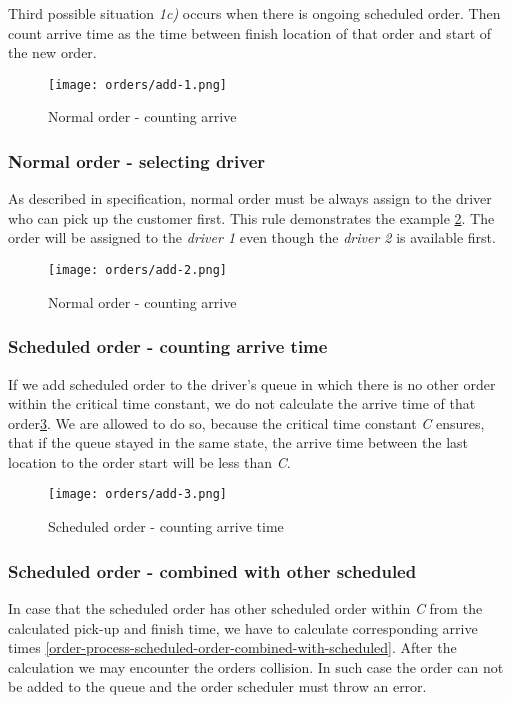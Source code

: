 	Third possible situation \textit{1c)} occurs when there is ongoing scheduled order. Then count arrive time as the time between finish location of that order and start of the new order.
	
	
		\begin{figure}[h]\centering
			\texttt{[image: orders/add-1.png]}
			\caption{Normal order - counting arrive} 
			\label{order-process-normal-order-counting-arrive}
		\end{figure} 
	
	\subsubsection{Normal order - selecting driver}
	
		As described in specification, normal order must be always assign to the driver who can pick up the customer first. This rule demonstrates the example  \ref{order-process-normal-order-selecting-driver}. The order will be assigned to the \textit{driver 1} even though the \textit{driver 2} is available first.
			
			\begin{figure}[h]\centering
				\texttt{[image: orders/add-2.png]}
				\caption{Normal order - counting arrive} 
				\label{order-process-normal-order-selecting-driver}
			\end{figure} 
		
	\subsubsection{Scheduled order - counting arrive time}
		If we add scheduled order to the driver's queue in which there is no other order within the critical time constant, we do not calculate the arrive time of that order\ref{order-process-scheduled-order-counting-arrive-time}. We are allowed to do so, because the critical time constant \textit{C} ensures, that if the queue stayed in the same state, the arrive time between the last location to the order start will be less than \textit{C}.
		
		\begin{figure}[h]\centering
			\texttt{[image: orders/add-3.png]}
			\caption{Scheduled order - counting arrive time} 
			\label{order-process-scheduled-order-counting-arrive-time}
		\end{figure} 
	
	
	\subsubsection{Scheduled order - combined with other scheduled}
			In case that the scheduled order has other scheduled order within \textit{C} from the calculated pick-up and finish time, we have to calculate corresponding arrive times \ref{order-process-scheduled-order-combined-with-scheduled}. 
			After the calculation we may encounter the orders collision. In such case the order can not be added to the queue and the order scheduler must throw an error. 
			
